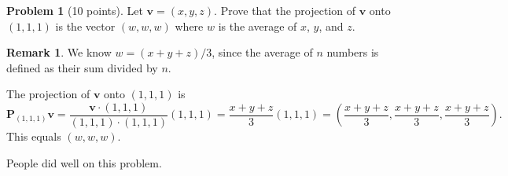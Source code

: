 \documentclass[11pt,oneside]{amsart}
\theoremstyle{definition}
\newtheorem{problem}{Problem}
\newtheorem*{remark}{Remark}
\theoremstyle{plain}
\newcommand{\BP}{{\mathbf{P}}}
\newcommand{\bv}{{\mathbf{v}}}
\begin{document}
\newpage

\begin{problem}[10 points]
  Let $\bv=(x,y,z)$. Prove that the projection of $\bv$ onto $(1,1,1)$ is the vector $(w,w,w)$ where $w$ is the average of $x$, $y$, and $z$.
\end{problem}
\begin{remark}\color{blue}
  We know $w=(x+y+z)/3$, since the average of $n$ numbers is defined as their sum divided by $n$.

  The projection of $\bv$ onto $(1,1,1)$ is
  \[\BP_{(1,1,1)}\bv=\frac{\bv\cdot(1,1,1)}{(1,1,1)\cdot(1,1,1)}(1,1,1)=\frac{x+y+z}{3}(1,1,1)=\left(\frac{x+y+z}3,\frac{x+y+z}3,\frac{x+y+z}3\right).\]
  This equals $(w,w,w)$.

  People did well on this problem.

\end{remark}

\newpage
\end{document}
